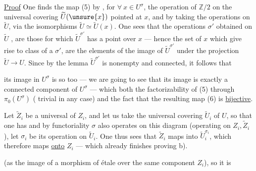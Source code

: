 \uline{Proof} One finds the map (5) by
, for $\forall\ x\in U^\sigma$, the  operation of
$\mathbb Z/2$ on the universal covering $\widetilde U(\unsure{x})$ pointed
at $x$, and by  taking the
 operations on $\widetilde U$,  via
the isomorphisms $\widetilde U\simeq\widetilde U(x)$. One sees that
the  operations $\sigma'$ obtained on $\widetilde U$ , are
those for which  $\widetilde U^{\sigma'}$ has a
point over $x$ --- hence the set
of $x$ which give rise to 
class of a $\sigma'$, are the elements of
the image of $\widetilde U^{\sigma'}$ under the projection
$\widetilde U\longrightarrow U$. Since by the lemma $\widetilde U^{\sigma'}$
is nonempty and connected, it follows that

its image in $U^\sigma$ is so too --- we are going to
see that its image is exactly a connected
component of $U^\sigma$ --- which  both
the factorizability of (5) through  $\pi_0(U^\sigma)$
( trivial in any case) and the fact that
the resulting map (6) is \uline{bijective}.

Let $\widetilde Z_i$ be a universal  of $Z_i$,
and let us take the  universal covering
$\widetilde U_i$ of $U$, so that one has
and by functoriality $\sigma$ also operates on this
diagram (operating  on $Z_i,\widetilde Z_i$),
let $\sigma_i$ be its operation on $\widetilde U_i$. One
thus sees that $\widetilde Z_i$ maps into $\widetilde U_i^{\sigma_i}$,
which therefore maps \uline{onto} $Z_i$ --- which already finishes
proving b).

(as the image of a morphism of étale 
over the same component $Z_i$), so it is

